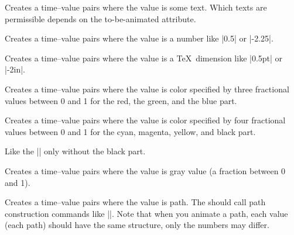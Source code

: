\begin{command}{\pgfsys@animation@val@text{}}
  Creates a time--value pairs where the value is some text. Which
  texts are permissible depends on the to-be-animated attribute.
\end{command}

\begin{command}{\pgfsys@animation@val@scalar{}}
  Creates a time--value pairs where the value is a number like |0.5|
  or |-2.25|.
\end{command}

\begin{command}{\pgfsys@animation@val@dimension{}}
  Creates a time--value pairs where the value is a \TeX\ dimension
  like |0.5pt| or |-2in|.
\end{command}

\begin{command}{\pgfsys@animation@val@color@rgb{}}
  Creates a time--value pairs where the value is color
  specified by three fractional values between 0 and 1 for the red,
  the green, and the blue part.
\end{command}

\begin{command}{\pgfsys@animation@val@color@cmyk{}}
  Creates a time--value pairs where the value is color
  specified by four fractional values between 0 and 1 for the cyan,
  magenta, yellow, and black part.
\end{command}

\begin{command}{\pgfsys@animation@val@color@cmy{}}
  Like the |\pgfsys@animation@color@cmyk| only without the black part.
\end{command}

\begin{command}{\pgfsys@animation@color@gray{}}
  Creates a time--value pairs where the value is gray value (a
  fraction between 0 and 1).
\end{command}

\begin{command}{\pgfsys@animation@val@path{}}
  Creates a time--value pairs where the value is path. The 
  should call path construction commands like |\pgfsys@lineto|. Note
  that when you animate a path, each value (each path) should have the
  same structure, only the numbers may differ.  
\end{command}

